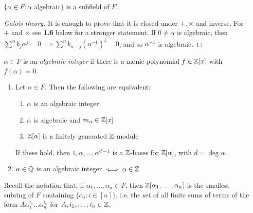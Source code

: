 \documentclass[10pt,a4paper]{article}
\begin{document}
\begin{proposition}
$\{\alpha \in F : \alpha$ algebraic$\}$ is a subfield of $F$.
\end{proposition}
\begin{proof}[Galois theory]
It is enough to prove that it is closed under $+, \times$ and inverse. For $+$ and $\times$ see \textbf{1.6} below for a stronger statement. If $0 \neq \alpha$ is algebraic, then $\sum^n b_j \alpha^j = 0 \implies \sum^n b_{n-j}(\alpha^{-1})^j = 0$, and so $\alpha^{-1}$ is algebraic.
\end{proof}

$\alpha \in F$ is an \emph{algebraic integer} if there is a monic polynomial $f \in \mathbb{Z}[x]$ with $f(\alpha) = 0$.

\begin{lemma}
\item
\begin{enumerate}
\item Let $\alpha \in F$. Then the following are equivalent:
\begin{enumerate}
\item $\alpha$ is an algebraic integer
\item $\alpha$ is algebraic and $m_\alpha \in \mathbb{Z}[x]$
\item $\mathbb{Z}[\alpha]$ is a finitely generated $\mathbb{Z}$-module
\end{enumerate}
If these hold, then $1, \alpha, \ldots, \alpha^{d-1}$ is a $\mathbb{Z}$-bases for $\mathbb{Z}[\alpha]$, with $d = \deg \alpha$.
\item $\alpha \in \mathbb{Q}$ is an algebraic integer $\iff \alpha \in \mathbb{Z}$
\end{enumerate}
\end{lemma}
Recall the notation that, if $\alpha_1, \ldots, \alpha_n \in F$, then $\mathbb{Z}[\alpha_1, \ldots, \alpha_n]$ is the smallest subring of $F$ containing $\{\alpha_i:i\in[n]\}$, i.e. the set of all finite sums of terms of the form $A\alpha_1^{i_1}\ldots\alpha_n^{i_n}$ for $A, i_1, \ldots, i_n \in \mathbb{Z}$.
\end{document}
